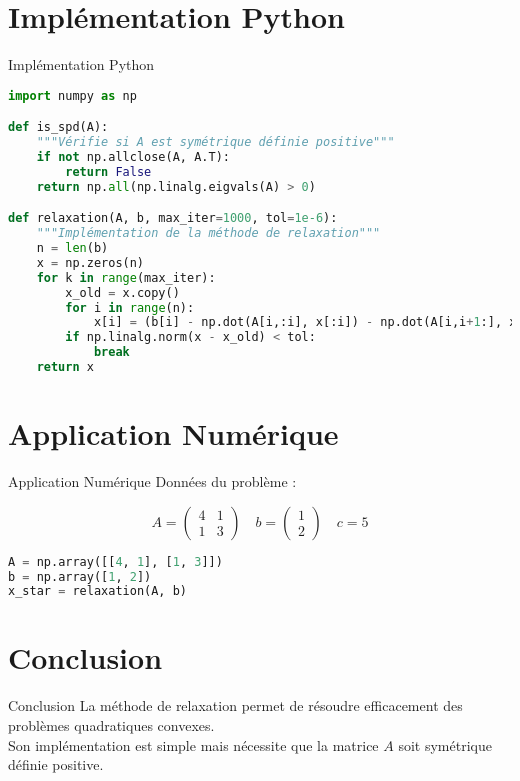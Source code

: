 \documentclass[
  ignorenonframetext,
]{beamer}
\begin{document}
\section{Implémentation Python}\label{impluxe9mentation-python}

\begin{frame}[fragile]{Implémentation Python}
\begin{lstlisting}[language=Python]
import numpy as np

def is_spd(A):
    """Vérifie si A est symétrique définie positive"""
    if not np.allclose(A, A.T):
        return False
    return np.all(np.linalg.eigvals(A) > 0)

def relaxation(A, b, max_iter=1000, tol=1e-6):
    """Implémentation de la méthode de relaxation"""
    n = len(b)
    x = np.zeros(n)
    for k in range(max_iter):
        x_old = x.copy()
        for i in range(n):
            x[i] = (b[i] - np.dot(A[i,:i], x[:i]) - np.dot(A[i,i+1:], x_old[i+1:])) / A[i,i]
        if np.linalg.norm(x - x_old) < tol:
            break
    return x
\end{lstlisting}
\end{frame}

\section{Application Numérique}\label{application-numuxe9rique}

\begin{frame}[fragile]{Application Numérique}
Données du problème :

\[
A = \begin{pmatrix}
4 & 1 \\
1 & 3
\end{pmatrix}
\quad
b = \begin{pmatrix}
1 \\
2
\end{pmatrix}
\quad
c = 5
\]

\begin{lstlisting}[language=Python]
A = np.array([[4, 1], [1, 3]])
b = np.array([1, 2])
x_star = relaxation(A, b)
\end{lstlisting}
\end{frame}

\section{Conclusion}\label{conclusion}

\begin{frame}{Conclusion}
La méthode de relaxation permet de résoudre efficacement des problèmes
quadratiques convexes.\\
Son implémentation est simple mais nécessite que la matrice \(A\) soit
symétrique définie positive.
\end{frame}
\end{document}
